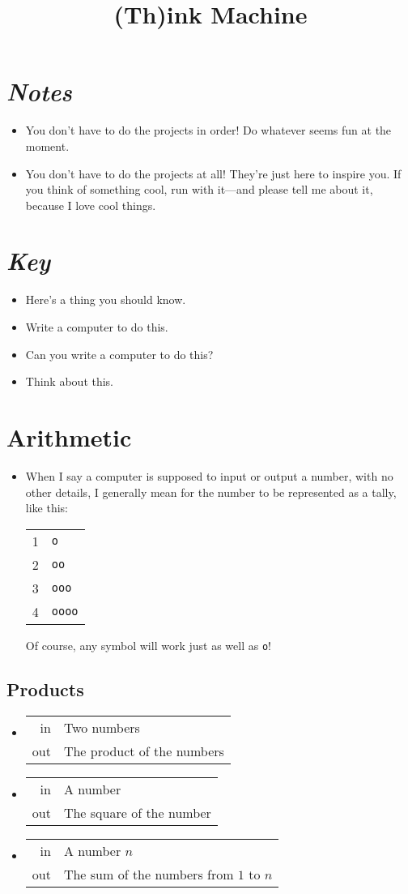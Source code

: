\documentclass{article}
\title{(Th)ink Machine}
\date{}
\newcommand*{\note}{\item[\Letter]}
\newcommand*{\writeit}{\item[\NibRight]}
\newcommand*\proveit{\item[\manimpossiblecube]}
\newcommand*{\thinkit}{\item[\Coffeecup]}
\newcommand{\spec}[1]{{\sc #1}}
\newcommand{\str}[1]{\texttt{#1}}
\begin{document}
\maketitle
\section*{\textit{Notes}}
\begin{itemize}
\note You don't have to do the projects in order! Do whatever seems fun at the moment.
\note You don't have to do the projects at all! They're just here to inspire you. If you think of something cool, run with it---and please tell me about it, because I love cool things.
\end{itemize}
\section*{\textit{Key}}
\begin{itemize}
\note Here's a thing you should know.
\writeit Write a computer to do this.
\proveit Can you write a computer to do this?
\thinkit Think about this.
\end{itemize}
\section*{Arithmetic}
\begin{itemize}
\note When I say a computer is supposed to input or output a number, with no other details, I generally mean for the number to be represented as a tally, like this:
\begin{center}
\begin{tabular}{rl}
1 & \str{o} \\
2 & \str{oo} \\
3 & \str{ooo} \\
4 & \str{oooo}
\end{tabular}
\end{center}
Of course, any symbol will work just as well as \str{o}!
\end{itemize}
\subsection*{Products}
\begin{itemize}
\writeit
\begin{tabular}{rl}
\spec{in} & Two numbers \\
\spec{out} & The product of the numbers
\end{tabular}
\writeit
\begin{tabular}{rl}
\spec{in} & A number \\
\spec{out} & The square of the number
\end{tabular}
\writeit
\begin{tabular}{rl}
\spec{in} & A number $n$ \\
\spec{out} & The sum of the numbers from $1$ to $n$
\end{tabular}
\end{itemize}
\end{document}
